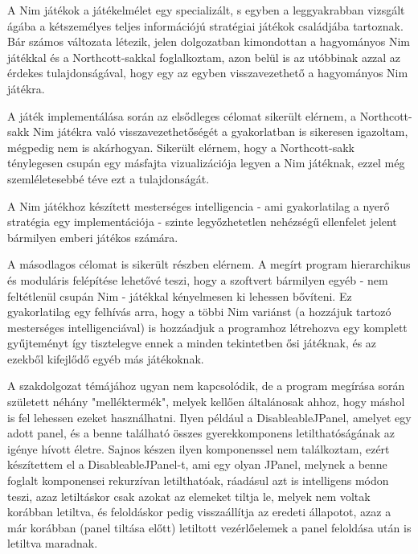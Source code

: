 \label{Chap:osszefoglalas}

A Nim játékok a játékelmélet egy specializált, s egyben a leggyakrabban vizsgált ágába a kétszemélyes teljes információjú stratégiai játékok családjába tartoznak. Bár számos változata létezik, jelen dolgozatban kimondottan a hagyományos Nim játékkal és a Northcott-sakkal foglalkoztam, azon belül is az utóbbinak azzal az érdekes tulajdonságával, hogy egy az egyben visszavezethető a hagyományos Nim játékra.\ujsor

A játék implementálása során az elsődleges célomat sikerült elérnem, a Northcott-sakk Nim játékra való visszavezethetőségét a gyakorlatban is sikeresen igazoltam, mégpedig nem is akárhogyan. Sikerült elérnem, hogy a Northcott-sakk ténylegesen csupán egy másfajta vizualizációja legyen a Nim játéknak, ezzel még szemléletesebbé téve ezt a tulajdonságát.\ujsor

A Nim játékhoz készített mesterséges intelligencia - ami gyakorlatilag a nyerő stratégia egy implementációja - szinte legyőzhetetlen nehézségű ellenfelet jelent bármilyen emberi játékos számára.\ujsor

A másodlagos célomat is sikerült részben elérnem. A megírt program hierarchikus és moduláris felépítése lehetővé teszi, hogy a szoftvert bármilyen egyéb - nem feltétlenül csupán Nim - játékkal kényelmesen ki lehessen bővíteni. Ez gyakorlatilag egy felhívás arra, hogy a többi Nim variánst (a hozzájuk tartozó mesterséges intelligenciával) is hozzáadjuk a programhoz létrehozva egy komplett gyűjteményt így tisztelegve ennek a minden tekintetben ősi játéknak, és az ezekből kifejlődő egyéb más játékoknak.\ujsor

A szakdolgozat témájához ugyan nem kapcsolódik, de a program megírása során született néhány "melléktermék", melyek kellően általánosak ahhoz, hogy máshol is fel lehessen ezeket használhatni. Ilyen például a DisableableJPanel, amelyet egy adott panel, és a benne található összes gyerekkomponens letilthatóságának az igénye hívott életre. Sajnos készen ilyen komponenssel nem találkoztam, ezért készítettem el a DisableableJPanel-t, ami egy olyan JPanel, melynek a benne foglalt komponensei rekurzívan letilthatóak, ráadásul azt is intelligens módon teszi, azaz letiltáskor csak azokat az elemeket tiltja le, melyek nem voltak korábban letiltva, és feloldáskor pedig visszaállítja az eredeti állapotot, azaz a már korábban (panel tiltása előtt) letiltott vezérlőelemek a panel feloldása után is letiltva maradnak.

